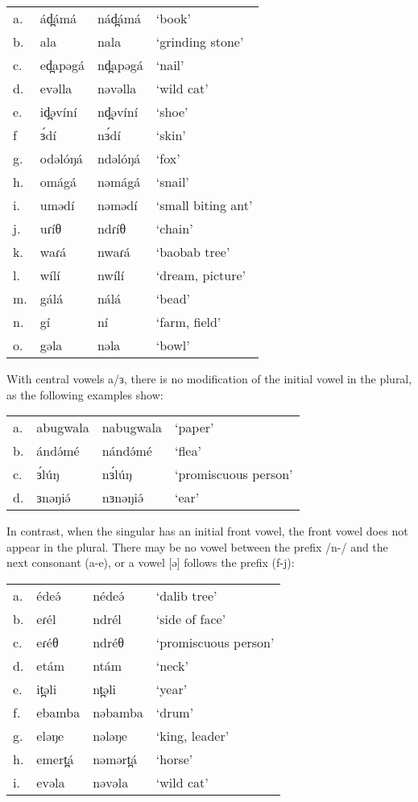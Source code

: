 \ea
\begin{tabular}[t]{llll}
a.	&	ád̪ámá	&	nád̪ámá	&	‘book’\\
b.	&	ala		&	nala		&	‘grinding stone’\\
c.	&	ed̪apəgá	&	nd̪apəgá	&	‘nail’\\
d.	&	evəlla	&	nəvəlla	&	‘wild cat’\\
e.	&	id̪əvíní	&	nd̪əvíní	&	‘shoe’\\
f	&	ɜ́dí		&	nɜ́dí	&	‘skin’\\
g.	&	odəlóŋá	&	ndəlóŋá	&	‘fox’\\
h.	&	omágá	&	nəmágá	&	‘snail’\\
i.	&	umədí	&	nəmədí	&	‘small biting ant’\\
j.	&	uɾíθ	&	ndɾíθ	&	‘chain’\\
k.	&	waɾá	&	nwaɾá	&	‘baobab tree’\\
l.	&	wílí	&	nwílí	&	‘dream, picture’\\
m.	&	gálá	&	nálá		&	‘bead’\\
n.	&	gí		&	ní		&	‘farm, field’\\
o.	&	gəla	&	nəla		&	‘bowl’\\	
\end{tabular}

\z

With central vowels a/ɜ, there is no modification of the initial vowel in the plural, as the following examples show:

\ea	
\begin{tabular}[t]{llll}
a.	&	abugwala	&	nabugwala	&	‘paper’\\
b.	&	ándə́mé		&	nándə́mé		&	‘flea’\\
c.	&	ɜ́lúŋ		&	nɜ́lúŋ		&	‘promiscuous person’\\
d.	&	ɜnəŋiə́		&	nɜnəŋiə́		&	‘ear’\\	
\end{tabular}

\z

In contrast, when the singular has an initial front vowel, the front vowel does not appear in the plural. There may be no vowel between the prefix /n-/ and the next consonant (a-e), or a vowel [ə] follows the prefix (f-j):

\ea	
\begin{tabular}[t]{llll}
a.	&	édeə́			&	nédeə́		&	‘dalib tree’\\
b.	&	eɾél		&	ndrél	&	‘side of face’\\
c.	&	eɾéθ		&	ndréθ	&	‘promiscuous person’\\
d.	&	etám		&	ntám		&	‘neck’\\
e.	&	it̪əli		&	nt̪əli	&	‘year’\\
f.	&	ebamba		&	nəbamba	&	‘drum’\\
g.	&	eləŋe		&	nələŋe	&	‘king, leader’\\
h.	&	emert̪á		&	nəmərt̪á	&	‘horse’\\
i.	&	evəla		&	nəvəla	&	‘wild cat’\\	
\end{tabular}
\z

